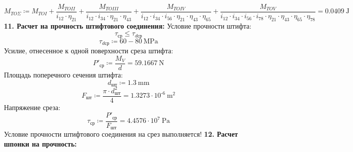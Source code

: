 \documentclass{article}
\newcommand{\defeq}{\coloneq} %
\begin{document}
\begin{equation*}
M_{TOΣ} \defeq M_{TOI}+\frac{M_{TOII}}{\textit{i}_{\textit{12}} \cdot \textit{η}_{\textit{21}}}+\frac{M_{TOIII}}{\textit{i}_{\textit{12}} \cdot \textit{i}_{\textit{34}} \cdot \textit{η}_{\textit{21}} \cdot \textit{η}_{\textit{43}}}+\frac{M_{TOIV}}{\textit{i}_{\textit{12}} \cdot \textit{i}_{\textit{34}} \cdot \textit{i}_{\textit{56}} \cdot \textit{η}_{\textit{21}} \cdot \textit{η}_{\textit{43}} \cdot \textit{η}_{\textit{65}}}+\frac{M_{TOV}}{\textit{i}_{\textit{12}} \cdot \textit{i}_{\textit{34}} \cdot \textit{i}_{\textit{56}} \cdot \textit{i}_{\textit{78}} \cdot \textit{η}_{\textit{21}} \cdot \textit{η}_{\textit{43}} \cdot \textit{η}_{\textit{65}} \cdot \textit{η}_{\textit{78}}} = {0.0409 \: \mathrm{J}}
\end{equation*}
\colorbox[HTML]{000000}{\textbf{11. Расчет на прочность штифтового соединения:}}\newline
\colorbox[HTML]{000000}{Условие прочности штифта:}\newline
\begin{equation*}
τ_{ср} \leq τ_{dср}
\end{equation*}
\begin{equation*}
τ_{dср} \defeq 60-80 \: \mathrm{MPa}
\end{equation*}
\colorbox[HTML]{000000}{Усилие, отнесенное к одной поверхности среза штифта:}\newline
\begin{equation*}
P'_{ср} \defeq \frac{M_{V}}{d} = {59.1667 \: \mathrm{N}}
\end{equation*}
\colorbox[HTML]{000000}{Площадь поперечного сечения штифта:}\newline
\begin{equation*}
d_{шт} \defeq 1.3 \: \mathrm{mm}
\end{equation*}
\begin{equation*}
F_{шт} \defeq \frac{{\pi} \cdot d_{шт}^{2}}{4} = {1.3273 \cdot 10^{ \operatorname{-} 6} \: \mathrm{m}^{2}}
\end{equation*}
\colorbox[HTML]{000000}{Напряжение среза:}\newline
\begin{equation*}
τ_{ср} \defeq \frac{P'_{ср}}{F_{шт}} = {4.4576 \cdot 10^{7} \: \mathrm{Pa}}
\end{equation*}
\colorbox[HTML]{FFFF80}{Условие прочности штифтового соединения на срез выполняется!}\newline
\colorbox[HTML]{000000}{\textbf{12. Расчет шпонки на прочность:}}\newline
\end{document}
